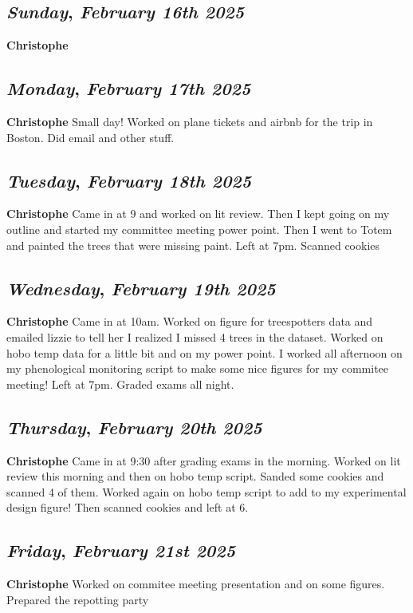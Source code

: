 \def\day{\textit{February 16th 2025}}
\def\weekday{\textit{Sunday}}
\subsection*{\weekday, \day}
\textbf {Christophe}

\def\day{\textit{February 17th 2025}}
\def\weekday{\textit{Monday}}
\subsection*{\weekday, \day}
\textbf {Christophe}
Small day! Worked on plane tickets and airbnb for the trip in Boston. Did email and other stuff.

\def\day{\textit{February 18th 2025}}
\def\weekday{\textit{Tuesday}}
\subsection*{\weekday, \day}
\textbf {Christophe}
Came in at 9 and worked on lit review. Then I kept going on my outline and started my committee meeting power point. Then I went to Totem and painted the trees that were missing paint. Left at 7pm. Scanned cookies

\def\day{\textit{February 19th 2025}}
\def\weekday{\textit{Wednesday}}
\subsection*{\weekday, \day}
\textbf {Christophe}
Came in at 10am. Worked on figure for treespotters data and emailed lizzie to tell her I realized I missed 4 trees in the dataset. Worked on hobo temp data for a little  bit and on my power point. I worked all afternoon on my phenological monitoring script to make some nice figures for my commitee meeting! Left at 7pm. Graded exams all night.

\def\day{\textit{February 20th 2025}}
\def\weekday{\textit{Thursday}}
\subsection*{\weekday, \day}
\textbf {Christophe}
Came in at 9:30 after grading exams in the morning. Worked on lit review this morning and then on hobo temp script. Sanded some cookies and scanned 4 of them. Worked again on hobo temp script to add to my experimental design figure! Then scanned cookies and left at 6. 

\def\day{\textit{February 21st 2025}}
\def\weekday{\textit{Friday}}
\subsection*{\weekday, \day}
\textbf {Christophe}
Worked on commitee meeting presentation and on some figures. Prepared the repotting party

